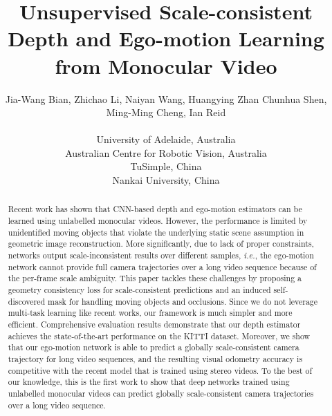 \documentclass{article}
\title{Unsupervised Scale-consistent Depth and Ego-motion Learning from Monocular Video}
\author{Jia-Wang Bian, Zhichao Li, Naiyan Wang,  Huangying Zhan
  \And Chunhua Shen, Ming-Ming Cheng, Ian Reid \\ \\
  University of Adelaide, Australia \\ 
  Australian Centre for Robotic Vision, Australia \\
  TuSimple, China \\ 
  Nankai University, China
}
\def\ie{\emph{i.e.}}
\begin{document}
\maketitle

\begin{abstract}
Recent work has shown that CNN-based depth and ego-motion estimators can be learned using unlabelled monocular videos.
However, the performance is limited by unidentified moving objects that violate the underlying static scene assumption in geometric image reconstruction.
More significantly, due to lack of proper constraints, networks output scale-inconsistent results over different samples, \ie, the ego-motion network cannot provide full camera trajectories over a long video sequence because of the per-frame scale ambiguity.
This paper tackles these challenges by proposing a geometry consistency loss for scale-consistent predictions and an induced self-discovered mask for handling moving objects and occlusions.
Since we do not leverage multi-task learning like recent works, our framework is much simpler and more efficient.
Comprehensive evaluation results demonstrate that our depth estimator achieves the state-of-the-art performance on the KITTI dataset.
Moreover, we show that our ego-motion network is able to predict a globally scale-consistent camera trajectory for long video sequences,
and the resulting visual odometry accuracy is competitive with the recent model that is trained using stereo videos.
To the best of our knowledge, this is the first work to show that deep networks trained using unlabelled monocular videos can predict globally scale-consistent camera trajectories over a long video sequence.

\end{abstract}
\end{document}
